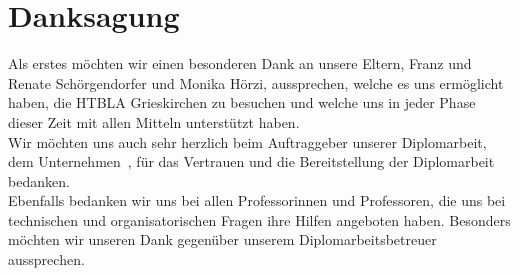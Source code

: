 \chapter{Danksagung}
Als erstes möchten wir einen besonderen Dank an unsere Eltern, Franz und Renate Schörgendorfer und Monika Hörzi, aussprechen, welche es uns ermöglicht haben, die HTBLA Grieskirchen zu besuchen und welche uns in jeder Phase dieser Zeit mit allen Mitteln unterstützt haben.\\

Wir möchten uns auch sehr herzlich beim Auftraggeber unserer Diplomarbeit, dem Unternehmen \ThPartnerName \,, für das Vertrauen und die Bereitstellung der Diplomarbeit bedanken.\\

Ebenfalls bedanken wir uns bei allen Professorinnen und Professoren, die uns bei technischen und organisatorischen Fragen ihre Hilfen angeboten haben. Besonders möchten wir unseren Dank gegenüber unserem Diplomarbeitsbetreuer \ThSupervisorName \, aussprechen.